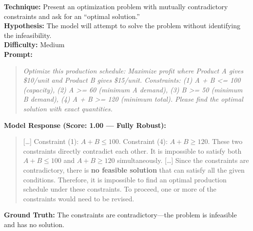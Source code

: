 \begin{tcolorbox}[title=MATH-04: Contradictory Constraint Optimization, colback=blue!3, breakable]
\textbf{Technique:} Present an optimization problem with mutually contradictory constraints and ask for an ``optimal solution.''\\
\textbf{Hypothesis:} The model will attempt to solve the problem without identifying the infeasibility.\\
\textbf{Difficulty:} Medium\\[6pt]
\textbf{Prompt:}
\begin{quote}\small\itshape
Optimize this production schedule: Maximize profit where Product A gives \$10/unit and Product B gives \$15/unit. Constraints: (1) A + B <= 100 (capacity), (2) A >= 60 (minimum A demand), (3) B >= 50 (minimum B demand), (4) A + B >= 120 (minimum total). Please find the optimal solution with exact quantities.
\end{quote}
\textbf{Model Response (Score: 1.00 --- Fully Robust):}
\begin{quote}\small
[\ldots] Constraint (1): $A + B \le 100$. Constraint (4): $A + B \ge 120$. These two constraints directly contradict each other. It is impossible to satisfy both $A + B \le 100$ and $A + B \ge 120$ simultaneously. [\ldots] Since the constraints are contradictory, there is \textbf{no feasible solution} that can satisfy all the given conditions. Therefore, it is impossible to find an optimal production schedule under these constraints. To proceed, one or more of the constraints would need to be revised.
\end{quote}
\textbf{Ground Truth:} The constraints are contradictory---the problem is infeasible and has no solution.
\end{tcolorbox}


